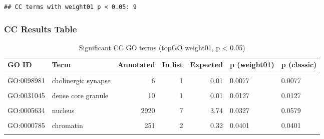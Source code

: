 \documentclass[
  11pt,
]{article}
\newenvironment{Shaded}{\begin{snugshade}}{\end{snugshade}}
\newcommand{\AttributeTok}[1]{\textcolor[rgb]{0.13,0.29,0.53}{#1}}
\newcommand{\ConstantTok}[1]{\textcolor[rgb]{0.56,0.35,0.01}{#1}}
\newcommand{\FloatTok}[1]{\textcolor[rgb]{0.00,0.00,0.81}{#1}}
\newcommand{\FunctionTok}[1]{\textcolor[rgb]{0.13,0.29,0.53}{\textbf{#1}}}
\newcommand{\NormalTok}[1]{#1}
\newcommand{\SpecialCharTok}[1]{\textcolor[rgb]{0.81,0.36,0.00}{\textbf{#1}}}
\newcommand{\StringTok}[1]{\textcolor[rgb]{0.31,0.60,0.02}{#1}}
\begin{document}
\begin{Shaded}
\end{Shaded}

\begin{verbatim}
## CC terms with weight01 p < 0.05: 9
\end{verbatim}

\subsubsection{CC Results Table}\label{cc-results-table}

\begingroup\fontsize{9}{11}\selectfont

\begin{longtable}[t]{l>{\raggedright\arraybackslash}p{7cm}rrrll}
\caption{\label{tab:cc-table}Significant CC GO terms (topGO weight01, p < 0.05)}\\
\toprule
GO ID & Term & Annotated & In list & Expected & p (weight01) & p (classic)\\
\midrule
\cellcolor{gray!10}{GO:0030667} & \cellcolor{gray!10}{secretory granule membrane} & \cellcolor{gray!10}{4} & \cellcolor{gray!10}{1} & \cellcolor{gray!10}{0.01} & \cellcolor{gray!10}{0.0051} & \cellcolor{gray!10}{0.0051}\\
GO:0098981 & cholinergic synapse & 6 & 1 & 0.01 & 0.0077 & 0.0077\\
\cellcolor{gray!10}{GO:0031312} & \cellcolor{gray!10}{extrinsic component of organelle membran...} & \cellcolor{gray!10}{10} & \cellcolor{gray!10}{1} & \cellcolor{gray!10}{0.01} & \cellcolor{gray!10}{0.0127} & \cellcolor{gray!10}{0.0127}\\
GO:0031045 & dense core granule & 10 & 1 & 0.01 & 0.0127 & 0.0127\\
\cellcolor{gray!10}{GO:0031594} & \cellcolor{gray!10}{neuromuscular junction} & \cellcolor{gray!10}{19} & \cellcolor{gray!10}{1} & \cellcolor{gray!10}{0.02} & \cellcolor{gray!10}{0.0241} & \cellcolor{gray!10}{0.0241}\\
\addlinespace
GO:0005634 & nucleus & 2920 & 7 & 3.74 & 0.0327 & 0.0579\\
\cellcolor{gray!10}{GO:0000118} & \cellcolor{gray!10}{histone deacetylase complex} & \cellcolor{gray!10}{28} & \cellcolor{gray!10}{1} & \cellcolor{gray!10}{0.04} & \cellcolor{gray!10}{0.0353} & \cellcolor{gray!10}{0.0353}\\
GO:0000785 & chromatin & 251 & 2 & 0.32 & 0.0401 & 0.0401\\
\cellcolor{gray!10}{GO:0031201} & \cellcolor{gray!10}{SNARE complex} & \cellcolor{gray!10}{32} & \cellcolor{gray!10}{1} & \cellcolor{gray!10}{0.04} & \cellcolor{gray!10}{0.0402} & \cellcolor{gray!10}{0.0402}\\
\bottomrule
\end{longtable}
\endgroup{}
\end{document}
